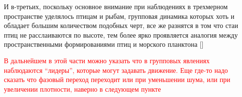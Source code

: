 	\marginpar{}
    И в-третьих, поскольку основное внимание при наблюдениях в трехмерном пространстве уделялось птицам и рыбам, групповая динамика которых хоть и обладает большим количеством подобных черт, все же разнятся в том что стаи птиц не расслаиваются по высоте, тем более ярко проявляется аналогия между пространственными формированиями птиц и морского планктона []
	
    \textcolor{red}{В дальнейшем в этой части можно указать что в групповых явлениях наблюдаются ``лидеры'', которые могут задавать движение. Еще где-то надо сказать что фазовый переход переходит или при уменьшении шума, или при увеличении плотности, наверно в следующем пункте}


